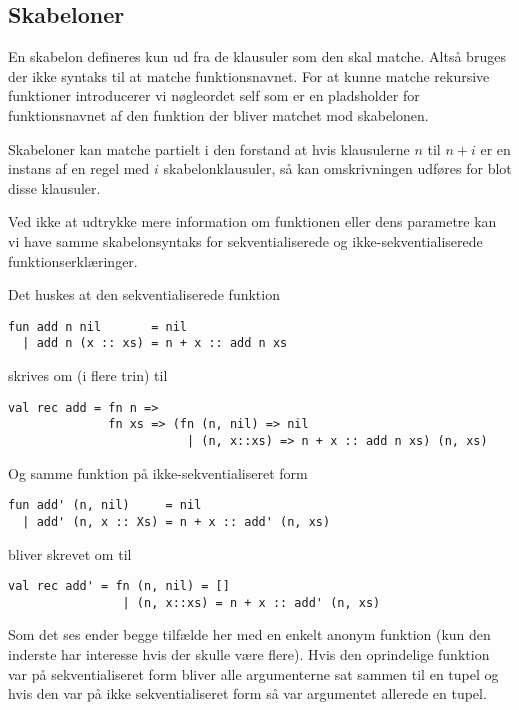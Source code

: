 \subsection{Skabeloner}

En skabelon defineres kun ud fra de klausuler som den skal matche. Altså
bruges der ikke syntaks til at matche funktionsnavnet. For at kunne matche
rekursive funktioner introducerer vi nøgleordet \textsf{self} som er en
pladsholder for funktionsnavnet af den funktion der bliver matchet mod
skabelonen.


Skabeloner kan matche partielt i den forstand at hvis klausulerne $n$ til $n +
i$ er en instans af en regel med $i$ skabelonklausuler, så kan omskrivningen
udføres for blot disse klausuler.

Ved ikke at udtrykke mere information om funktionen eller dens parametre kan vi
have samme skabelonsyntaks for sekventialiserede og ikke-sekventialiserede
funktionserklæringer.

Det huskes at den sekventialiserede funktion

\begin{verbatim}
fun add n nil       = nil
  | add n (x :: xs) = n + x :: add n xs
\end{verbatim}

skrives om (i flere trin) til

\begin{verbatim}
val rec add = fn n => 
              fn xs => (fn (n, nil) => nil
                         | (n, x::xs) => n + x :: add n xs) (n, xs)
\end{verbatim}

Og samme funktion på ikke-sekventialiseret form

\begin{verbatim}
fun add' (n, nil)     = nil
  | add' (n, x :: Xs) = n + x :: add' (n, xs)
\end{verbatim}

bliver skrevet om til

\begin{verbatim}
val rec add' = fn (n, nil) = []
                | (n, x::xs) = n + x :: add' (n, xs)
\end{verbatim}

Som det ses ender begge tilfælde her med en enkelt anonym funktion (kun den inderste
har interesse hvis der skulle være flere). Hvis den oprindelige funktion var på
sekventialiseret form bliver alle argumenterne sat sammen til en tupel og hvis
den var på ikke sekventialiseret form så var argumentet allerede en tupel.

